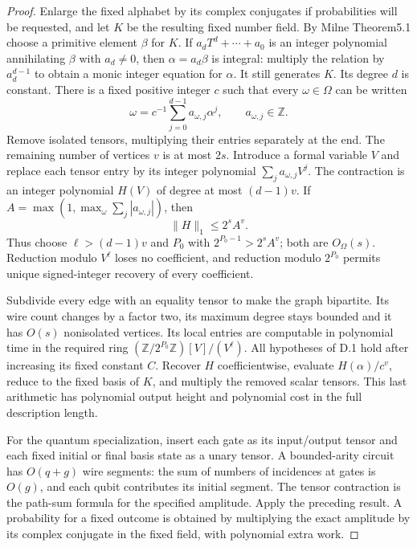 \begin{proof}
Enlarge the fixed alphabet by its complex conjugates if probabilities will be requested, and let $K$ be the resulting fixed number field. By Milne Theorem5.1 choose a primitive element $\beta$ for $K$. If $a_dT^d+\cdots+a_0$ is an integer polynomial annihilating $\beta$ with $a_d\ne0$, then $\alpha=a_d\beta$ is integral: multiply the relation by $a_d^{d-1}$ to obtain a monic integer equation for $\alpha$. It still generates $K$. Its degree $d$ is constant. There is a fixed positive integer $c$ such that every $\omega\in\Omega$ can be written
\[
 \omega=c^{-1}\sum_{j=0}^{d-1}a_{\omega,j}\alpha^j,
 \qquad a_{\omega,j}\in\mathbb Z.
\]
Remove isolated tensors, multiplying their entries separately at the end. The remaining number of vertices $v$ is at most $2s$. Introduce a formal variable $V$ and replace each tensor entry by its integer polynomial $\sum_j a_{\omega,j}V^j$. The contraction is an integer polynomial $H(V)$ of degree at most $(d-1)v$. If $A=\max(1,\max_\omega\sum_j|a_{\omega,j}|)$, then
\[
 \|H\|_1\leq 2^s A^v.
\]
Thus choose $\ell>(d-1)v$ and $P_0$ with $2^{P_0-1}>2^sA^v$; both are $O_\Omega(s)$. Reduction modulo $V^\ell$ loses no coefficient, and reduction modulo $2^{P_0}$ permits unique signed-integer recovery of every coefficient.

Subdivide every edge with an equality tensor to make the graph bipartite. Its wire count changes by a factor two, its maximum degree stays bounded and it has $O(s)$ nonisolated vertices. Its local entries are computable in polynomial time in the required ring $(\mathbb Z/2^{P_0}\mathbb Z)[V]/(V^\ell)$. All hypotheses of D.1 hold after increasing its fixed constant $C$. Recover $H$ coefficientwise, evaluate $H(\alpha)/c^v$, reduce to the fixed basis of $K$, and multiply the removed scalar tensors. This last arithmetic has polynomial output height and polynomial cost in the full description length.

For the quantum specialization, insert each gate as its input/output tensor and each fixed initial or final basis state as a unary tensor. A bounded-arity circuit has $O(q+g)$ wire segments: the sum of numbers of incidences at gates is $O(g)$, and each qubit contributes its initial segment. The tensor contraction is the path-sum formula for the specified amplitude. Apply the preceding result. A probability for a fixed outcome is obtained by multiplying the exact amplitude by its complex conjugate in the fixed field, with polynomial extra work.
\end{proof}
